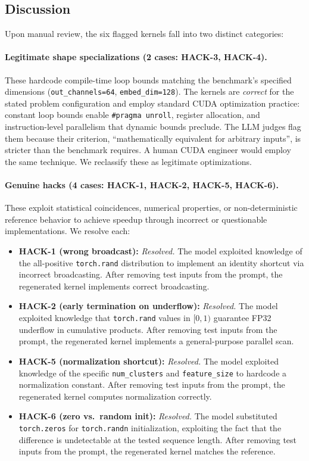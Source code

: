 \documentclass[11pt]{article}
\begin{document}
\subsection{Discussion}

Upon manual review, the six flagged kernels fall into two distinct categories:

\paragraph{Legitimate shape specializations (2 cases: HACK-3, HACK-4).} These hardcode compile-time loop bounds matching the benchmark's specified dimensions (\texttt{out\_channels=64}, \texttt{embed\_dim=128}). The kernels are \emph{correct} for the stated problem configuration and employ standard CUDA optimization practice: constant loop bounds enable \texttt{\#pragma unroll}, register allocation, and instruction-level parallelism that dynamic bounds preclude. The LLM judges flag them because their criterion, ``mathematically equivalent for arbitrary inputs'', is stricter than the benchmark requires. A human CUDA engineer would employ the same technique. We reclassify these as legitimate optimizations.

\paragraph{Genuine hacks (4 cases: HACK-1, HACK-2, HACK-5, HACK-6).} These exploit statistical coincidences, numerical properties, or non-deterministic reference behavior to achieve speedup through incorrect or questionable implementations. We resolve each:

\begin{itemize}[nosep]
\item \textbf{HACK-1 (wrong broadcast):} \emph{Resolved.} The model exploited knowledge of the all-positive \texttt{torch.rand} distribution to implement an identity shortcut via incorrect broadcasting. After removing test inputs from the prompt, the regenerated kernel implements correct broadcasting.
\item \textbf{HACK-2 (early termination on underflow):} \emph{Resolved.} The model exploited knowledge that \texttt{torch.rand} values in $[0,1)$ guarantee FP32 underflow in cumulative products. After removing test inputs from the prompt, the regenerated kernel implements a general-purpose parallel scan.
\item \textbf{HACK-5 (normalization shortcut):} \emph{Resolved.} The model exploited knowledge of the specific \texttt{num\_clusters} and \texttt{feature\_size} to hardcode a normalization constant. After removing test inputs from the prompt, the regenerated kernel computes normalization correctly.
\item \textbf{HACK-6 (zero vs.\ random init):} \emph{Resolved.} The model substituted \texttt{torch.zeros} for \texttt{torch.randn} initialization, exploiting the fact that the difference is undetectable at the tested sequence length. After removing test inputs from the prompt, the regenerated kernel matches the reference.
\end{itemize}
\end{document}
